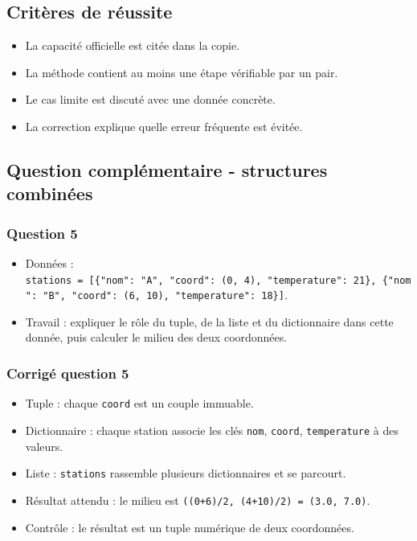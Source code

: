 \subsection{Critères de réussite}

\begin{itemize}
\tightlist
\item
  La capacité officielle est citée dans la copie.
\item
  La méthode contient au moins une étape vérifiable par un pair.
\item
  Le cas limite est discuté avec une donnée concrète.
\item
  La correction explique quelle erreur fréquente est évitée.
\end{itemize}

\subsection{Question complémentaire - structures combinées}

\subsubsection{Question 5}

\begin{itemize}
\tightlist
\item
  Données :
  \texttt{stations\ =\ {[}\{"nom":\ "A",\ "coord":\ (0,\ 4),\ "temperature":\ 21\},\ \{"nom":\ "B",\ "coord":\ (6,\ 10),\ "temperature":\ 18\}{]}}.
\item
  Travail : expliquer le rôle du tuple, de la liste et du dictionnaire
  dans cette donnée, puis calculer le milieu des deux coordonnées.
\end{itemize}

\subsubsection{Corrigé question 5}

\begin{itemize}
\tightlist
\item
  Tuple : chaque \texttt{coord} est un couple immuable.
\item
  Dictionnaire : chaque station associe les clés \texttt{nom},
  \texttt{coord}, \texttt{temperature} à des valeurs.
\item
  Liste : \texttt{stations} rassemble plusieurs dictionnaires et se
  parcourt.
\item
  Résultat attendu : le milieu est
  \texttt{((0+6)/2,\ (4+10)/2)\ =\ (3.0,\ 7.0)}.
\item
  Contrôle : le résultat est un tuple numérique de deux coordonnées.
\end{itemize}

